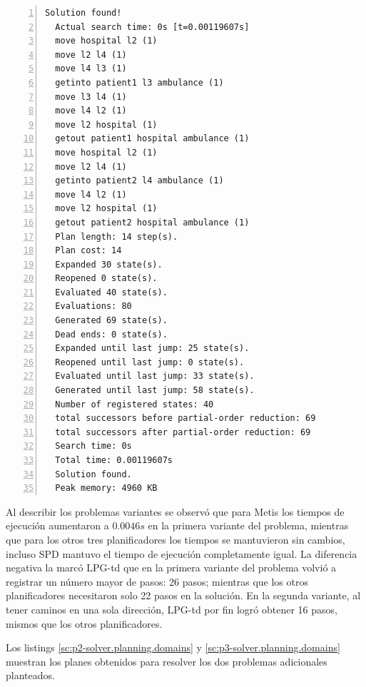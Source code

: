 \documentclass[a4paper,12pt]{article}
\begin{document}




\begin{lstlisting}[style=consola, numbers=left, caption=Resultado de Metis \label{sc:Metis}]
  Solution found!
  Actual search time: 0s [t=0.00119607s]
  move hospital l2 (1)
  move l2 l4 (1)
  move l4 l3 (1)
  getinto patient1 l3 ambulance (1)
  move l3 l4 (1)
  move l4 l2 (1)
  move l2 hospital (1)
  getout patient1 hospital ambulance (1)
  move hospital l2 (1)
  move l2 l4 (1)
  getinto patient2 l4 ambulance (1)
  move l4 l2 (1)
  move l2 hospital (1)
  getout patient2 hospital ambulance (1)
  Plan length: 14 step(s).
  Plan cost: 14
  Expanded 30 state(s).
  Reopened 0 state(s).
  Evaluated 40 state(s).
  Evaluations: 80
  Generated 69 state(s).
  Dead ends: 0 state(s).
  Expanded until last jump: 25 state(s).
  Reopened until last jump: 0 state(s).
  Evaluated until last jump: 33 state(s).
  Generated until last jump: 58 state(s).
  Number of registered states: 40
  total successors before partial-order reduction: 69
  total successors after partial-order reduction: 69
  Search time: 0s
  Total time: 0.00119607s
  Solution found.
  Peak memory: 4960 KB
\end{lstlisting}

Al describir los problemas variantes se observó que para Metis los tiempos de ejecución aumentaron a $0.0046 s$ en la primera variante del problema, mientras que para los otros tres planificadores los tiempos se mantuvieron sin cambios, incluso SPD mantuvo el tiempo de ejecución completamente igual. La diferencia negativa la marcó LPG-td que en la primera variante del problema volvió a registrar un número mayor de pasos: 26 pasos; mientras que los otros planificadores necesitaron solo 22 pasos en la solución. En la segunda variante, al tener caminos en una sola dirección, LPG-td por fin logró obtener 16 pasos, mismos que los otros planificadores.

Los listings \ref{sc:p2-solver.planning.domains} y \ref{sc:p3-solver.planning.domains} muestran los planes obtenidos para resolver los dos problemas adicionales planteados.
\end{document}
